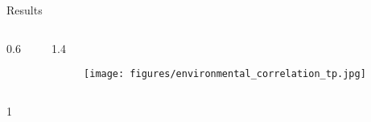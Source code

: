\documentclass[final]{beamer}
\newlength{\onecolwid}
\newlength{\twocolwid}
\begin{document}
\begin{frame}[t]
\begin{columns}[t]
\begin{column}{\twocolwid}
\begin{block}{Results}
\begin{columns}[t,totalwidth=\twocolwid]
\begin{column}{0.6\onecolwid}
\begin{scriptsize}
\end{scriptsize}






% 




\end{column} %

\begin{column}{1.4\onecolwid} %



\begin{figure}
  \texttt{[image: figures/environmental\_correlation\_tp.jpg]}
\end{figure}





\end{column} %

\end{columns} %


\vspace{4cm}




\begin{columns}[t,totalwidth=\twocolwid] %

\begin{column}{1\onecolwid} %





\end{column}
\end{columns}
\end{block}
\end{column}
\end{columns}
\end{frame}
\end{document}
